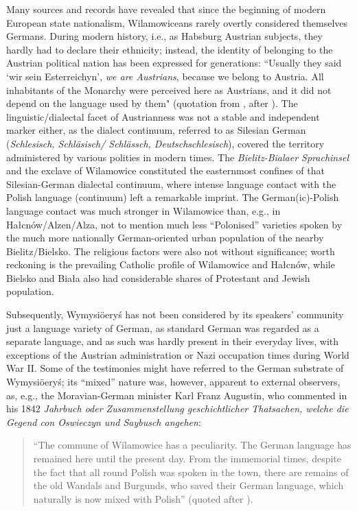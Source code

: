\documentclass[output=paper]{langscibook}
\begin{document}
Many sources and records have revealed that since the beginning of modern European state nationalism, Wilamowiceans rarely overtly considered themselves Germans. During modern history, i.e., as Habsburg Austrian subjects, they hardly had to declare their ethnicity; instead, the identity of belonging to the Austrian political nation has been expressed for generations: “Usually they said ‘wir sein Esterreichyn’, \textit{we are Austrians}, because we belong to Austria. All inhabitants of the Monarchy were perceived here as Austrians, and it did not depend on the language used by them" (quotation from \citealt[162]{filip_flamandowie_2005}, after \citealt[96]{chromik_wilamowice_2016}). The linguistic/dialectal facet of Austrianness was not a stable and independent marker either, as the dialect continuum, referred to as Silesian German (\textit{Schlesisch, Schläsisch/ Schlässch, Deutschschlesisch}), covered the territory administered by various polities in modern times. The \textit{Bielitz-Bialaer Sprachinsel} and the exclave of Wilamowice constituted the easternmost confines of that Silesian-German dialectal continuum, where intense language contact with the Polish language (continuum) left a remarkable imprint. The German(ic)-Polish language contact was much stronger in Wilamowice than, e.g., in Hałcnów/Alzen/Alza, not to mention much less “Polonised” varieties spoken by the much more nationally German-oriented urban population of the nearby Bielitz/Bielsko. The religious factors were also not without significance; worth reckoning is the prevailing Catholic profile of Wilamowice and Hałcnów, while Bielsko and Biała also had considerable shares of Protestant and Jewish population.

Subsequently, Wymysiöeryś has not been considered by its speakers’ community just a language variety of German, as standard German was regarded as a separate language, and as such was hardly present in their everyday lives, with exceptions of the Austrian administration or Nazi occupation times during World War II. Some of the testimonies might have referred to the German substrate of Wymysiöeryś; its “mixed” nature was, however, apparent to external observers, as, e.g., the Moravian-German minister Karl Franz Augustin, who commented in his 1842 \textit{Jahrbuch oder Zusammenstellung geschichtlicher Thatsachen, welche die Gegend con Oswieczyn und Saybusch angehen}: 

\begin{quote}
    “The commune of Wilamowice has a peculiarity. The German language has remained here until the present day. From the immemorial times, despite the fact that all round Polish was spoken in the town, there are remains of the old Wandals and Burgunds, who saved their German language, which naturally is now mixed with Polish” (quoted after \citealt[96]{chromik_wilamowice_2016}).
\end{quote}
\end{document}
